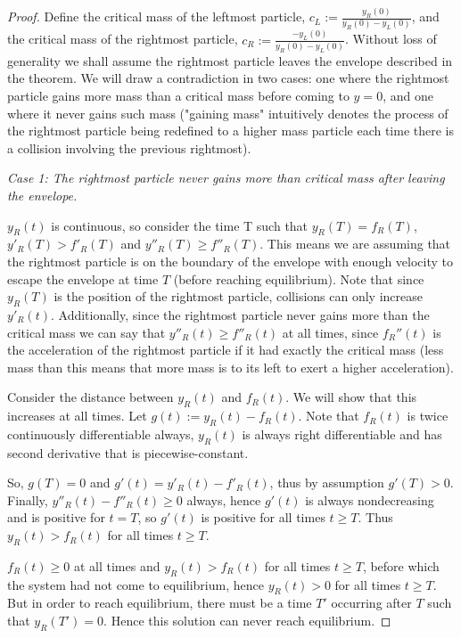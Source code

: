 \documentclass[11pt]{article}
\numberwithin{equation}{section}
\begin{document}
        \begin{proof}
            Define the critical mass of the leftmost particle, $c_L:=\frac{y_R(0)}{y_R(0)-y_L(0)}$, and the critical mass of the rightmost particle, $c_R:=\frac{-y_L(0)}{y_R(0)-y_L(0)}$. Without loss of generality we shall assume the rightmost particle leaves the envelope described in the theorem. We will draw a contradiction in two cases: one where the rightmost particle gains more mass than a critical mass before coming to $y=0$, and one where it never gains such mass ("gaining mass" intuitively denotes the process of the rightmost particle being redefined to a higher mass particle each time there is a collision involving the previous rightmost).
            
            {\textit{Case 1: The rightmost particle never gains more than critical mass after leaving  the envelope.}}
            
            $y_R(t)$ is continuous, so consider the time T such that $y_R(T)=f_R(T)$, $y'_R(T)>f'_R(T)$ and $y''_R(T)\geq f''_R(T)$. This means we are assuming that the rightmost particle is on the boundary of the envelope with enough velocity to escape the envelope at time $T$ (before reaching equilibrium). Note that since $y_R(T)$ is the position of the rightmost particle, collisions can only increase $y'_R(t)$. Additionally, since  the rightmost particle never gains more than the critical mass we can say that $y''_R(t)\geq f''_R(t)$ at all times, since $f_R''(t)$ is the acceleration of the rightmost particle if it had exactly the critical mass (less mass than this means that more mass is to its left to exert a higher acceleration).
            
            Consider the distance between $y_R(t)$ and $f_R(t)$. We will show that this increases at all times. Let $g(t):=y_R(t)-f_R(t)$. Note that $f_R(t)$ is twice continuously differentiable always, $y_R(t)$ is always right differentiable and has second derivative that is piecewise-constant. 
            
            So, $g(T)=0$ and $g'(t)=y'_R(t)-f'_R(t)$, thus by assumption $g'(T)>0$. Finally, $y''_R(t)-f''_R(t)\geq0$ always, hence $g'(t)$ is always nondecreasing and is positive for $t=T$, so $g'(t)$ is positive for all times $t\geq T$. Thus $y_R(t)>f_R(t)$ for all times $t\geq T$. 
            
    
            $f_R(t)\geq0$ at all times and $y_R(t)>f_R(t)$ for all times $t\geq T$, before which the system had not come to equilibrium, hence $y_R(t)>0$ for all times $t\geq T$. But in order to reach equilibrium, there must be a time $T'$ occurring after $T$ such that $y_R(T')=0$. Hence this solution can never reach equilibrium. 
            

\end{proof}
\end{document}
